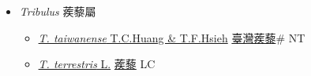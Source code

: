 
  \begin{itemize}
 \item[] \textit{Tribulus} 蒺藜屬
                    
  \begin{itemize}
        \item[] \href{http://www.theplantlist.org/tpl1.1/search?q=Tribulus+taiwanense}{\textit{T. taiwanense} T.C.Huang \& T.F.Hsieh}   \href{\detokenize{http://taibnet.sinica.edu.tw/chi/taibnet_species_list.php?T2=臺灣蒺藜&T2_new_value=true&fr=y}}{臺灣蒺藜}\# NT
        \item[] \href{http://www.theplantlist.org/tpl1.1/search?q=Tribulus+terrestris}{\textit{T. terrestris} L.}   \href{\detokenize{http://taibnet.sinica.edu.tw/chi/taibnet_species_list.php?T2=蒺藜&T2_new_value=true&fr=y}}{蒺藜} LC
  \end{itemize}
  \end{itemize}
